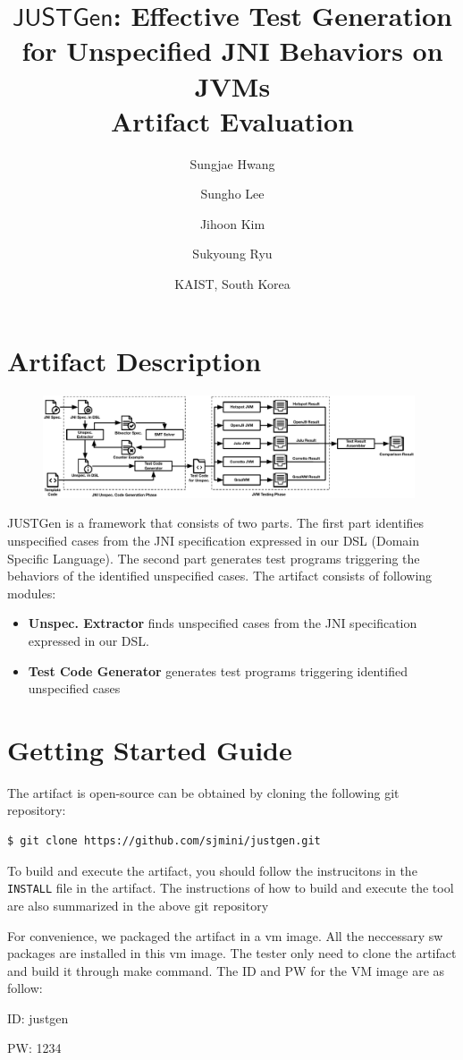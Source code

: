 \documentclass{article}
\begin{document}
\title{$\textsf{JUSTGen}$: Effective Test Generation for Unspecified JNI Behaviors on JVMs
\\ {\large Artifact Evaluation}}

\author{
  Sungjae Hwang
  \and
  Sungho Lee
  \and
  Jihoon Kim
  \and
  Sukyoung Ryu
}
\date{KAIST, South Korea}

\maketitle

\section{Artifact Description}

\begin{figure}[H]
  \includegraphics[width=0.98\textwidth]{dsl_overview3.pdf}
\end{figure}

JUSTGen is a framework that consists of two parts. The first part identifies unspecified cases from the JNI specification expressed in our DSL (Domain Specific Language). The second part generates test programs triggering the behaviors of the identified unspecified cases. The artifact consists of following modules:

\begin{itemize}
  \item \textbf{Unspec. Extractor} finds unspecified cases from the JNI specification expressed in our DSL. 
  \item \textbf{Test Code Generator} generates test programs triggering identified unspecified cases
  
\end{itemize}


\section{Getting Started Guide}

The artifact is open-source can be obtained by cloning the following git
repository:
\begin{lstlisting}
$ git clone https://github.com/sjmini/justgen.git 
\end{lstlisting}
To build and execute the artifact, you should follow the instrucitons in the
\texttt{INSTALL} file in the artifact. 
The instructions of how to build and execute the tool are also summarized in the above git repository

For convenience, we packaged the artifact in a vm image.
All the neccessary sw packages are installed in this vm image.
The tester only need to clone the artifact and build it through make command.
The ID and PW for the VM image are as follow:

ID: justgen

PW: 1234
\end{document}
